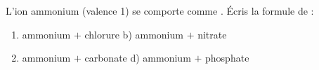 \documentclass[11pt,a4paper]{article}
\begin{document}
\begin{exercice}
L'ion ammonium  (valence 1) se comporte comme . Écris la formule de :
\begin{enumerate}[label=\alph*),leftmargin=1.8em,topsep=1pt,itemsep=1pt]
  \item ammonium $+$ chlorure  \qquad b) ammonium $+$ nitrate 
  \item[c)] ammonium $+$ carbonate  \qquad d) ammonium $+$ phosphate 
\end{enumerate}
\end{exercice}
\end{document}
